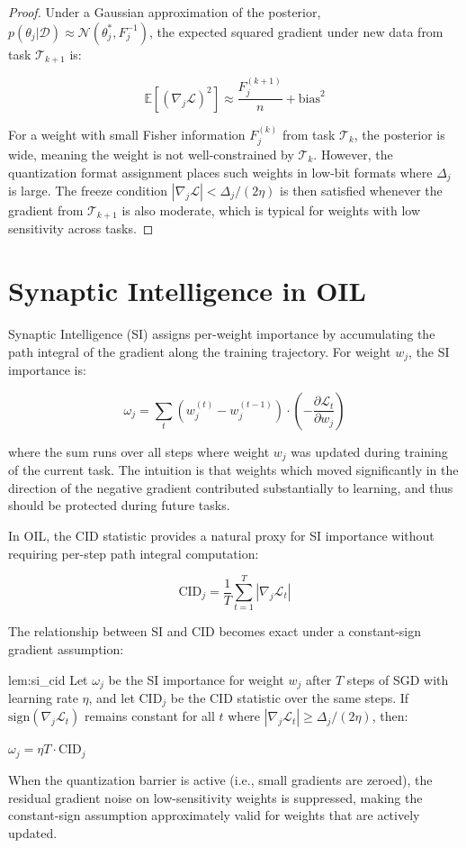 \begin{proof}
Under a Gaussian approximation of the posterior, $p(\theta_j | \mathcal{D}) \approx \mathcal{N}(\theta_j^*, F_j^{-1})$, the expected squared gradient under new data from task $\mathcal{T}_{k+1}$ is:

$$\mathbb{E}\left[(\nabla_j \mathcal{L})^2\right] \approx \frac{F_j^{(k+1)}}{n} + \text{bias}^2$$

For a weight with small Fisher information $F_j^{(k)}$ from task $\mathcal{T}_k$, the posterior is wide, meaning the weight is not well-constrained by $\mathcal{T}_k$. However, the quantization format assignment places such weights in low-bit formats where $\Delta_j$ is large. The freeze condition $|\nabla_j \mathcal{L}| < \Delta_j / (2\eta)$ is then satisfied whenever the gradient from $\mathcal{T}_{k+1}$ is also moderate, which is typical for weights with low sensitivity across tasks.
\end{proof}

\section{Synaptic Intelligence in OIL}
\label{sec:si_oil}

Synaptic Intelligence (SI) \cite{zenke2017} assigns per-weight importance by accumulating the path integral of the gradient along the training trajectory. For weight $w_j$, the SI importance is:

$$\omega_j = \sum_{t} (w_j^{(t)} - w_j^{(t-1)}) \cdot \left(-\frac{\partial \mathcal{L}_t}{\partial w_j}\right)$$

where the sum runs over all steps where weight $w_j$ was updated during training of the current task. The intuition is that weights which moved significantly in the direction of the negative gradient contributed substantially to learning, and thus should be protected during future tasks.

In OIL, the CID statistic provides a natural proxy for SI importance without requiring per-step path integral computation:

$$ \text{CID}_j = \frac{1}{T} \sum_{t=1}^{T} |\nabla_j \mathcal{L}_t| $$

The relationship between SI and CID becomes exact under a constant-sign gradient assumption:

\begin{mylemma}{lem:si_cid}
Let $\omega_j$ be the SI importance for weight $w_j$ after $T$ steps of SGD with learning rate $\eta$, and let $\text{CID}_j$ be the CID statistic over the same steps. If $\text{sign}(\nabla_j \mathcal{L}_t)$ remains constant for all $t$ where $|\nabla_j \mathcal{L}_t| \geq \Delta_j / (2\eta)$, then:

$\omega_j = \eta T \cdot \text{CID}_j$

When the quantization barrier is active (i.e., small gradients are zeroed), the residual gradient noise on low-sensitivity weights is suppressed, making the constant-sign assumption approximately valid for weights that are actively updated.
\end{mylemma}

